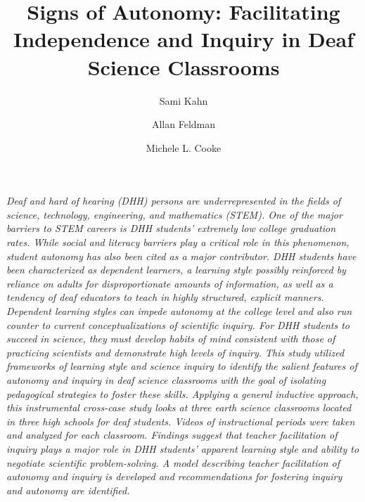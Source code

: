 \documentclass[11.5pt]{sig-alternate} %
\makeatletter
\let\oldabstract\abstract
\let\oldendabstract\endabstract
\renewenvironment{abstract} %
{\renewenvironment{quotation}%
               {\list{}{\addtolength{\leftmargin}{1em} %
                        \listparindent 1.5em%
                        \itemindent    \listparindent%
                        \rightmargin   \leftmargin%
                        \parsep        \z@ \@plus\p@}%
                \item\relax}%
               {\endlist}%
\oldabstract}
{\oldendabstract}
\makeatother
\begin{document}
\title{Signs of Autonomy: Facilitating Independence and Inquiry in Deaf Science Classrooms}

\author[1]{\large \color{blue}Sami Kahn}
\author[1]{\large \color{blue}Allan Feldman}
\author[2]{\large \color{blue}Michele L. Cooke}


\toappear{}
\maketitle
\begin{@twocolumnfalse} 
\begin{abstract}
\item 
\textit{Deaf and hard of hearing (DHH) persons are underrepresented in the fields of science, technology, engineering, and mathematics (STEM). One of the major barriers to STEM careers is DHH students’ extremely low college graduation rates. While social and literacy barriers play a critical role in this phenomenon, student autonomy has also been cited as a major contributor. DHH students have been characterized as dependent learners, a learning style possibly reinforced by reliance on adults for disproportionate amounts of information, as well as a tendency of deaf educators to teach in highly structured, explicit manners. Dependent learning styles can impede autonomy at the college level and also run counter to current conceptualizations of scientific inquiry. For DHH students to succeed in science, they must develop habits of mind consistent with those of practicing scientists and demonstrate high levels of inquiry. This study utilized frameworks of learning style and science inquiry to identify the salient features of autonomy and inquiry in deaf science classrooms with the goal of isolating pedagogical strategies to foster these skills. Applying a general inductive approach, this instrumental cross-case study looks at three earth science classrooms located in three high schools for deaf students. Videos of instructional periods were taken and analyzed for each classroom. Findings suggest that teacher facilitation of inquiry plays a major role in DHH students’ apparent learning style and ability to negotiate scientific problem-solving. A model describing teacher facilitation of autonomy and inquiry is developed and recommendations for fostering inquiry and autonomy are identified.}
\\ \\
\end{abstract}
\end{@twocolumnfalse}
\end{document}
